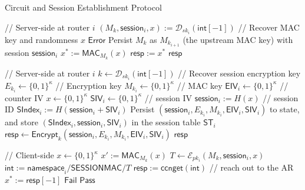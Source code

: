 \documentclass[10pt]{article}
\begin{document}
\begin{algorithm}[ht!]
  \caption{Circuit and Session Establishment Protocol}
  \begin{algorithmic}[1]

 // Server-side at router $i$
  \State $(M_{k}, \mathsf{session}_i, x) := \mathcal{D}_{sk_i}(\mathsf{int}[-1])$ // Recover MAC key and randomness $x$
    \State \Return $\mathsf{Error}$
  \Else
    \State Persist $M_k$ as $M_{k_{i+1}}$ (the upstream MAC key) with session $\mathsf{session}_i$
    \State $x^* := \mathsf{MAC}_{M_{k}}(x)$
    \State $\mathsf{resp} := x^*$
    \State \Return $\mathsf{resp}$
  \EndIf

\EndFunction

 // Server-side at router $i$
  \State $k \gets \mathcal{D}_{sk_i}(\mathsf{int}[-1])$ // Recover session encryption key
  \State $E_{k_i} \gets \{0,1\}^{\kappa}$ // Encryption key
  \State $M_{k_i} \gets \{0,1\}^{\kappa}$ // MAC key
  \State $\mathsf{EIV}_i \gets \{0,1\}^{\kappa}$     // counter IV
  \State $x \gets \{0,1\}^{\kappa}$
  \State $\mathsf{SIV}_i \gets \{0,1\}^{\kappa}$ // session IV
  \State $\mathsf{session}_i := H(x)$ // session ID
  \State $\mathsf{SIndex}_i := H(\mathsf{session}_i + \mathsf{SIV}_i)$
  \State Persist $(\mathsf{session}_i, E_{k_i}, M_{k_i}, \mathsf{EIV}_i, \mathsf{SIV}_i)$ to state, and store $(\mathsf{SIndex}_i, \mathsf{session}_i, \mathsf{SIV}_i)$ in the session table $\mathsf{ST}_i$
  \State $\mathsf{resp} \gets \mathsf{Encrypt}_{k}(\mathsf{session}_i, E_{k_i}, M_{k_i}, \mathsf{EIV}_i, \mathsf{SIV}_i)$
  \State \Return $\mathsf{resp}$
  
\EndFunction

 // Client-side
  \State $x \gets \{0,1\}^{\kappa}$
  \State $x' := \mathsf{MAC}_{M_{k}}(x)$
  \State $T \gets \mathcal{E}_{pk_i}(M_{k}, \mathsf{session}_i, x)$
  \State $\mathsf{int} := \mathsf{namespace}_i/\mathsf{SESSIONMAC}/T$
  \State $\mathsf{resp} := \mathsf{ccnget}(\mathsf{int})$ // reach out to the AR
  \State $x^* := \mathsf{resp}[-1]$
    \State \Return $\mathsf{Fail}$
  \Else
    \State \Return $\mathsf{Pass}$
  \EndIf


\end{algorithmic}
\end{algorithm}
\end{document}
